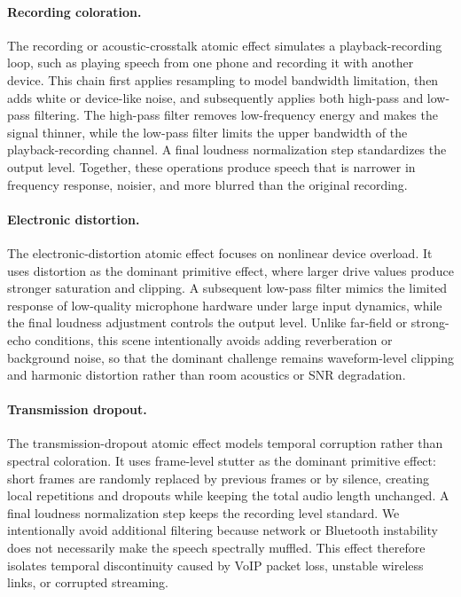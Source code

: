 \documentclass{article}
\begin{document}
\paragraph{Recording coloration.}
The recording or acoustic-crosstalk atomic effect simulates a playback-recording
loop, such as playing speech from one phone and recording it with another
device. This chain first applies resampling to model bandwidth limitation, then
adds white or device-like noise, and subsequently applies both high-pass and
low-pass filtering. The high-pass filter removes low-frequency energy and makes
the signal thinner, while the low-pass filter limits the upper bandwidth of the
playback-recording channel. A final loudness normalization step standardizes
the output level. Together, these operations produce speech that is narrower in
frequency response, noisier, and more blurred than the original recording.

\paragraph{Electronic distortion.}
The electronic-distortion atomic effect focuses on nonlinear device overload.
It uses distortion as the dominant primitive effect, where larger drive values
produce stronger saturation and clipping. A subsequent low-pass filter mimics
the limited response of low-quality microphone hardware under large input
dynamics, while the final loudness adjustment controls the output level. Unlike
far-field or strong-echo conditions, this scene intentionally avoids adding
reverberation or background noise, so that the dominant challenge remains
waveform-level clipping and harmonic distortion rather than room acoustics or
SNR degradation.

\paragraph{Transmission dropout.}
The transmission-dropout atomic effect models temporal corruption rather than
spectral coloration. It uses frame-level stutter as the dominant primitive
effect: short frames are randomly replaced by previous frames or by silence,
creating local repetitions and dropouts while keeping the total audio length
unchanged. A final loudness normalization step keeps the recording level
standard. We intentionally avoid additional filtering because network or
Bluetooth instability does not necessarily make the speech spectrally muffled.
This effect therefore isolates temporal discontinuity caused by VoIP packet
loss, unstable wireless links, or corrupted streaming.
\end{document}
